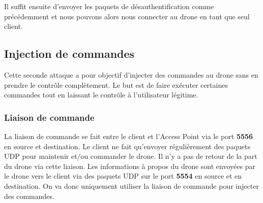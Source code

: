 Il suffit ensuite d'envoyer les paquets de désauthentification comme précédemment et nous pouvons alors nous connecter au drone en tant que seul client.

\subsection{Injection de commandes}
Cette seconde attaque a pour objectif d'injecter des commandes au drone sans en prendre le contrôle complètement. Le but est de faire exécuter certaines commandes tout en laissant le contrôle à l'utilisateur légitime.

\subsubsection{Liaison de commande}
La liaison de commande se fait entre le client et l'Access Point via le port \textbf{5556} en source et destination. Le client ne fait qu'envoyer régulièrement des paquets UDP pour maintenir et/ou commander le drone. Il n'y a pas de retour de la part du drone via cette liaison. Les informations à propos du drone sont envoyées par le drone vers le client via des paquets UDP sur le port \textbf{5554} en source et en destination. On va donc uniquement utiliser la liaison de commande pour injecter des commandes.

